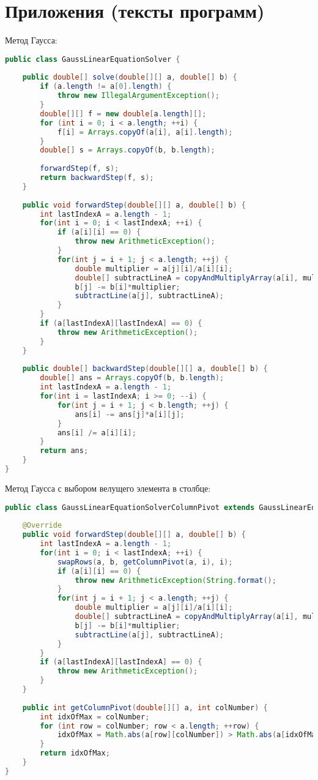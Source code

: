 \documentclass[14pt, a4paper]{extarticle}
\begin{document}
	\section{Приложения (тексты программ)}
	Метод Гаусса:		
	\begin{lstlisting}[language=java]
public class GaussLinearEquationSolver {
	
	public double[] solve(double[][] a, double[] b) {
		if (a.length != a[0].length) {
			throw new IllegalArgumentException();
		}
		double[][] f = new double[a.length][];
		for (int i = 0; i < a.length; ++i) {
			f[i] = Arrays.copyOf(a[i], a[i].length);
		}
		double[] s = Arrays.copyOf(b, b.length);
		
		forwardStep(f, s);
		return backwardStep(f, s);
	}
	
	public void forwardStep(double[][] a, double[] b) {
		int lastIndexA = a.length - 1;
		for(int i = 0; i < lastIndexA; ++i) {
			if (a[i][i] == 0) {
				throw new ArithmeticException();
			}
			for(int j = i + 1; j < a.length; ++j) {
				double multiplier = a[j][i]/a[i][i];
				double[] subtractLineA = copyAndMultiplyArray(a[i], multiplier);
				b[j] -= b[i]*multiplier;
				subtractLine(a[j], subtractLineA);
			}
		}
		if (a[lastIndexA][lastIndexA] == 0) {
			throw new ArithmeticException();
		}
	}
	
	public double[] backwardStep(double[][] a, double[] b) {
		double[] ans = Arrays.copyOf(b, b.length);
		int lastIndexA = a.length - 1;
		for(int i = lastIndexA; i >= 0; --i) {
			for(int j = i + 1; j < b.length; ++j) {
				ans[i] -= ans[j]*a[i][j];
			}
			ans[i] /= a[i][i];
		}
		return ans;
	}
}
	\end{lstlisting}

	Метод Гаусса с выбором велущего элемента в столбце:		
\begin{lstlisting}[language=java]
public class GaussLinearEquationSolverColumnPivot extends GaussLinearEquationSolver {
	
	@Override
	public void forwardStep(double[][] a, double[] b) {
		int lastIndexA = a.length - 1;
		for(int i = 0; i < lastIndexA; ++i) {
			swapRows(a, b, getColumnPivot(a, i), i);
			if (a[i][i] == 0) {
				throw new ArithmeticException(String.format();
			}
			for(int j = i + 1; j < a.length; ++j) {
				double multiplier = a[j][i]/a[i][i];
				double[] subtractLineA = copyAndMultiplyArray(a[i], multiplier);
				b[j] -= b[i]*multiplier;
				subtractLine(a[j], subtractLineA);
			}
		}
		if (a[lastIndexA][lastIndexA] == 0) {
			throw new ArithmeticException();
		}
	}
	
	public int getColumnPivot(double[][] a, int colNumber) {
		int idxOfMax = colNumber;
		for (int row = colNumber; row < a.length; ++row) {
			idxOfMax = Math.abs(a[row][colNumber]) > Math.abs(a[idxOfMax][colNumber]) ? row : idxOfMax;
		}
		return idxOfMax;
	}
}
\end{lstlisting}
\end{document}
